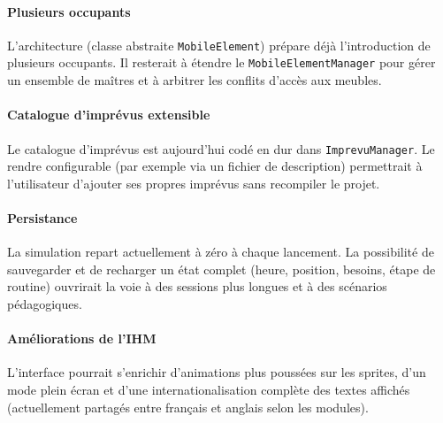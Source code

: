 \paragraph{Plusieurs occupants} L'architecture (classe abstraite \texttt{MobileElement}) prépare déjà l'introduction de plusieurs occupants. Il resterait à étendre le \texttt{MobileElementManager} pour gérer un ensemble de maîtres et à arbitrer les conflits d'accès aux meubles.

\paragraph{Catalogue d'imprévus extensible} Le catalogue d'imprévus est aujourd'hui codé en dur dans \texttt{ImprevuManager}. Le rendre configurable (par exemple via un fichier de description) permettrait à l'utilisateur d'ajouter ses propres imprévus sans recompiler le projet.

\paragraph{Persistance} La simulation repart actuellement à zéro à chaque lancement. La possibilité de sauvegarder et de recharger un état complet (heure, position, besoins, étape de routine) ouvrirait la voie à des sessions plus longues et à des scénarios pédagogiques.

\paragraph{Améliorations de l'IHM} L'interface pourrait s'enrichir d'animations plus poussées sur les sprites, d'un mode plein écran et d'une internationalisation complète des textes affichés (actuellement partagés entre français et anglais selon les modules).
